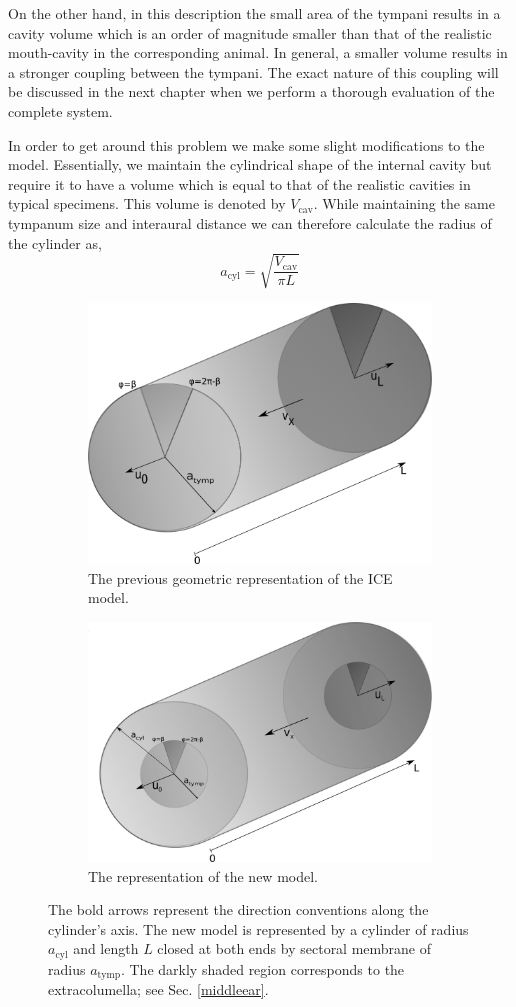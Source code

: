 On the other hand, in this description the small area of the tympani results in a cavity volume which 
is an order of magnitude smaller than that of the realistic mouth-cavity in the corresponding animal. In general, a smaller volume results in a stronger coupling between
the tympani. The exact nature of this coupling will be discussed in the next chapter when we perform a thorough evaluation of the complete system.

In order to get around this problem we make some slight modifications to the model. Essentially, we maintain the cylindrical shape of the internal 
cavity but require it to have a volume which is equal to that of the realistic cavities in typical specimens. This volume is denoted by $V_{\mathrm{cav}}$. 
While maintaining the same tympanum size and interaural distance we can therefore calculate the radius of the cylinder as,
\begin{equation}\label{cylinderradiusformula}
 a_{\mathrm{cyl}}=\sqrt{\frac{V_{\mathrm{cav}}}{\pi L}}
\end{equation}
\begin{figure}[ht!]
\begin{center}
\begin{subfigure}{1.0\textwidth}
 \centering
  \includegraphics[width=.5\linewidth]{Diagrams/oldCylinder.png}
   \caption[Previous ICE Model Cylinder]{The previous geometric representation of the ICE model.}
  \label{oldICE}
\end{subfigure}

\begin{subfigure}{1.0\textwidth}
\centering
  \includegraphics[width=.5\linewidth]{Diagrams/newCylinder.png}
  \caption[New ICE Model Cylinder]{The representation of the new model.}
  \label{newICE}
  \end{subfigure}
  \caption[Previous and current ICE model representations]{The bold arrows represent the direction conventions
  along the cylinder's axis. The new model is represented by a cylinder of radius $a_{\mathrm{cyl}}$ and length $L$ closed
  at both ends by sectoral membrane of radius $a_{\mathrm{tymp}}$.
  The darkly shaded region corresponds to the extracolumella; see Sec. \ref{middleear}.}
\end{center}
\end{figure}
